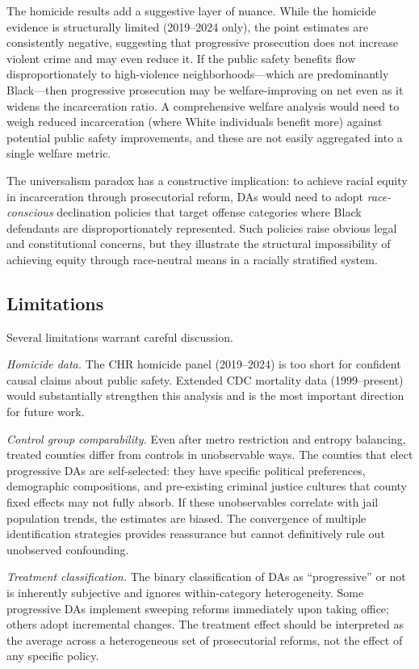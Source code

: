 \documentclass[12pt]{article}
\begin{document}
The homicide results add a suggestive layer of nuance. While the homicide evidence is structurally limited (2019--2024 only), the point estimates are consistently negative, suggesting that progressive prosecution does not increase violent crime and may even reduce it. If the public safety benefits flow disproportionately to high-violence neighborhoods---which are predominantly Black---then progressive prosecution may be welfare-improving on net even as it widens the incarceration ratio. A comprehensive welfare analysis would need to weigh reduced incarceration (where White individuals benefit more) against potential public safety improvements, and these are not easily aggregated into a single welfare metric.

The universalism paradox has a constructive implication: to achieve racial equity in incarceration through prosecutorial reform, DAs would need to adopt \textit{race-conscious} declination policies that target offense categories where Black defendants are disproportionately represented. Such policies raise obvious legal and constitutional concerns, but they illustrate the structural impossibility of achieving equity through race-neutral means in a racially stratified system.

\subsection{Limitations}

Several limitations warrant careful discussion.

\textit{Homicide data.} The CHR homicide panel (2019--2024) is too short for confident causal claims about public safety. Extended CDC mortality data (1999--present) would substantially strengthen this analysis and is the most important direction for future work.

\textit{Control group comparability.} Even after metro restriction and entropy balancing, treated counties differ from controls in unobservable ways. The counties that elect progressive DAs are self-selected: they have specific political preferences, demographic compositions, and pre-existing criminal justice cultures that county fixed effects may not fully absorb. If these unobservables correlate with jail population trends, the estimates are biased. The convergence of multiple identification strategies provides reassurance but cannot definitively rule out unobserved confounding.

\textit{Treatment classification.} The binary classification of DAs as ``progressive'' or not is inherently subjective and ignores within-category heterogeneity. Some progressive DAs implement sweeping reforms immediately upon taking office; others adopt incremental changes. The treatment effect should be interpreted as the average across a heterogeneous set of prosecutorial reforms, not the effect of any specific policy.
\end{document}

